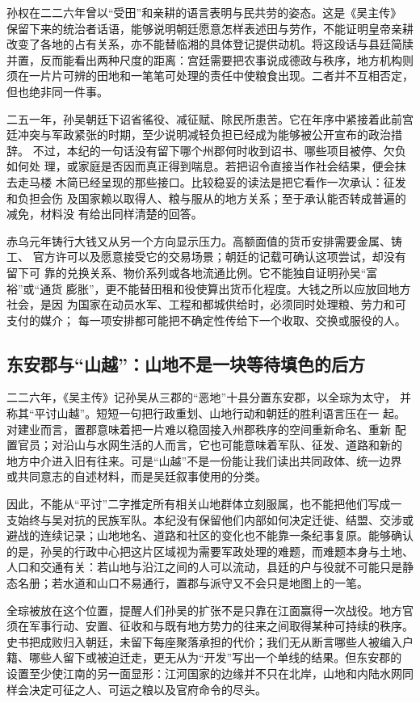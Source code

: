 孙权在二二六年曾以“受田”和亲耕的语言表明与民共劳的姿态。这是《吴主传》
保留下来的统治者话语，能够说明朝廷愿意怎样表述田与劳作，不能证明皇帝亲耕
改变了各地的占有关系，亦不能替临湘的具体登记提供动机。将这段话与县廷简牍
并置，反而能看出两种尺度的距离：宫廷需要把农事说成德政与秩序，地方机构则
须在一片片可辨的田地和一笔笔可处理的责任中使粮食出现。二者并不互相否定，
但也绝非同一件事。

二五一年，孙吴朝廷下诏省徭役、减征赋、除民所患苦。它在年序中紧接着此前宫
廷冲突与军政紧张的时期，至少说明减轻负担已经成为能够被公开宣布的政治措辞。
不过，本纪的一句话没有留下哪个州郡何时收到诏书、哪些项目被停、欠负如何处
理，或家庭是否因而真正得到喘息。若把诏令直接当作社会结果，便会抹去走马楼
木简已经呈现的那些接口。比较稳妥的读法是把它看作一次承认：征发和负担会伤
及国家赖以取得人、粮与服从的地方关系；至于承认能否转成普遍的减免，材料没
有给出同样清楚的回答。

赤乌元年铸行大钱又从另一个方向显示压力。高额面值的货币安排需要金属、铸工、
官方许可以及愿意接受它的交易场景；朝廷的记载可确认这项尝试，却没有留下可
靠的兑换关系、物价系列或各地流通比例。它不能独自证明孙吴“富裕”或“通货
膨胀”，更不能替田租和役使算出货币化程度。大钱之所以应放回地方社会，是因
为国家在动员水军、工程和都城供给时，必须同时处理粮、劳力和可支付的媒介；
每一项安排都可能把不确定性传给下一个收取、交换或服役的人。

\subsection{东安郡与“山越”：山地不是一块等待填色的后方}

二二六年，《吴主传》记孙吴从三郡的“恶地”十县分置东安郡，以全琮为太守，
并称其“平讨山越”。短短一句把行政重划、山地行动和朝廷的胜利语言压在一
起。对建业而言，置郡意味着把一片难以稳固接入州郡秩序的空间重新命名、重新
配置官员；对沿山与水网生活的人而言，它也可能意味着军队、征发、道路和新的
地方中介进入旧有往来。可是“山越”不是一份能让我们读出共同政体、统一边界
或共同意志的自述材料，而是吴廷叙事使用的分类。

因此，不能从“平讨”二字推定所有相关山地群体立刻服属，也不能把他们写成一
支始终与吴对抗的民族军队。本纪没有保留他们内部如何决定迁徙、结盟、交涉或
避战的连续记录；山地地名、道路和社区的变化也不能靠一条纪事复原。能够确认
的是，孙吴的行政中心把这片区域视为需要军政处理的难题，而难题本身与土地、
人口和交通有关：若山地与沿江之间的人可以流动，县廷的户与役就不可能只是静
态名册；若水道和山口不易通行，置郡与派守又不会只是地图上的一笔。

全琮被放在这个位置，提醒人们孙吴的扩张不是只靠在江面赢得一次战役。地方官
须在军事行动、安置、征收和与既有地方势力的往来之间取得某种可持续的秩序。
史书把成败归入朝廷，未留下每座聚落承担的代价；我们无从断言哪些人被编入户
籍、哪些人留下或被迫迁走，更无从为“开发”写出一个单线的结果。但东安郡的
设置至少使江南的另一面显形：江河国家的边缘并不只在北岸，山地和内陆水网同
样会决定可征之人、可运之粮以及官府命令的尽头。

